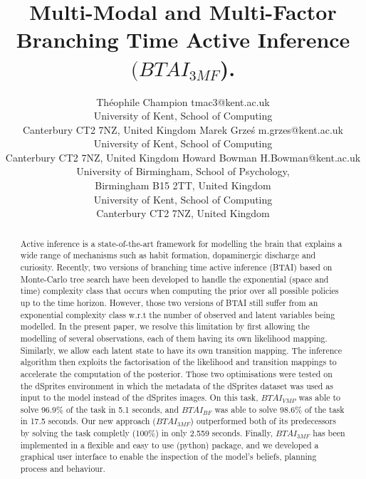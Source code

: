 \documentclass[twoside,11pt]{article}
\begin{document}
\title{Multi-Modal and Multi-Factor Branching Time Active Inference $(BTAI_{3MF}$).}

\author{\name Théophile Champion \email tmac3@kent.ac.uk \\
       \addr University of Kent, School of Computing\\
       Canterbury CT2 7NZ, United Kingdom
       \AND
       \name Marek Grze\'s \email m.grzes@kent.ac.uk \\
       \addr University of Kent, School of Computing\\
       Canterbury CT2 7NZ, United Kingdom
       \AND
       \name Howard Bowman \email H.Bowman@kent.ac.uk \\
       \addr University of Birmingham, School of Psychology,\\
       Birmingham B15 2TT, United Kingdom\\
       University of Kent, School of Computing\\
       Canterbury CT2 7NZ, United Kingdom
       }
       

\maketitle

\begin{abstract}%
Active inference is a state-of-the-art framework for modelling the brain that explains a wide range of mechanisms such as habit formation, dopaminergic discharge and curiosity. Recently, two versions of branching time active inference (BTAI) based on Monte-Carlo tree search have been developed to handle the exponential (space and time) complexity class that occurs when computing the prior over all possible policies up to the time horizon. However, those two versions of BTAI still suffer from an exponential complexity class w.r.t the number of observed and latent variables being modelled. In the present paper, we resolve this limitation by first allowing the modelling of several observations, each of them having its own likelihood mapping. Similarly, we allow each latent state to have its own transition mapping. The inference algorithm then exploits the factorisation of the likelihood and transition mappings to accelerate the computation of the posterior. Those two optimisations were tested on the dSprites environment in which the metadata of the dSprites dataset was used as input to the model instead of the dSprites images. On this task, $BTAI_{VMP}$ \citep{AITS_THEORY, AITS_PRACTICE} was able to solve 96.9\% of the task in 5.1 seconds, and $BTAI_{BF}$ \citep{BTAI_BF} was able to solve 98.6\% of the task in 17.5 seconds. Our new approach ($BTAI_{3MF}$) outperformed both of its predecessors by solving the task completly (100\%) in only 2.559 seconds. Finally, $BTAI_{3MF}$ has been implemented in a flexible and easy to use (python) package, and we developed a graphical user interface to enable the inspection of the model's beliefs, planning process and behaviour.
\end{abstract}
\end{document}
